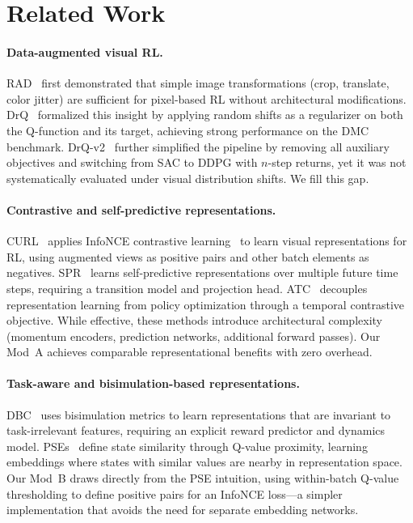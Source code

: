 \documentclass{article}
\begin{document}
\section{Related Work}
\label{sec:related}

\paragraph{Data-augmented visual RL.}
RAD~\citep{laskin2020reinforcement} first demonstrated that simple image transformations (crop, translate, color jitter) are sufficient for pixel-based RL without architectural modifications.
DrQ~\citep{kostrikov2021image} formalized this insight by applying random shifts as a regularizer on both the Q-function and its target, achieving strong performance on the DMC benchmark.
DrQ-v2~\citep{yarats2022mastering} further simplified the pipeline by removing all auxiliary objectives and switching from SAC to DDPG with $n$-step returns, yet it was not systematically evaluated under visual distribution shifts.
We fill this gap.

\paragraph{Contrastive and self-predictive representations.}
CURL~\citep{srinivas2020curl} applies InfoNCE contrastive learning~\citep{oord2018representation} to learn visual representations for RL, using augmented views as positive pairs and other batch elements as negatives.
SPR~\citep{schwarzer2021data} learns self-predictive representations over multiple future time steps, requiring a transition model and projection head.
ATC~\citep{stooke2021decoupling} decouples representation learning from policy optimization through a temporal contrastive objective.
While effective, these methods introduce architectural complexity (momentum encoders, prediction networks, additional forward passes).
Our Mod~A achieves comparable representational benefits with zero overhead.

\paragraph{Task-aware and bisimulation-based representations.}
DBC~\citep{zhang2021learning} uses bisimulation metrics to learn representations that are invariant to task-irrelevant features, requiring an explicit reward predictor and dynamics model.
PSEs~\citep{agarwal2021contrastive} define state similarity through Q-value proximity, learning embeddings where states with similar values are nearby in representation space.
Our Mod~B draws directly from the PSE intuition, using within-batch Q-value thresholding to define positive pairs for an InfoNCE loss---a simpler implementation that avoids the need for separate embedding networks.
\end{document}
